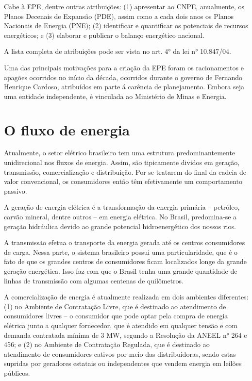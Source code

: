 \documentclass[grad,numbers]{coppe}
\begin{document}
  Cabe à EPE, dentre outras atribuições: (1) apresentar ao CNPE, anualmente, os Planos Decenais de Expansão (PDE), assim como a cada dois anos os Planos Nacionais de Energia (PNE); (2) identificar e quantificar os potenciais de recursos energéticos; e (3) elaborar e publicar o balanço energético nacional.
  
  A lista completa de atribuições pode ser vista no art. 4° da lei n° 10.847/04.
  
  Uma das principais motivações para a criação da EPE foram os racionamentos e apagões ocorridos no início da década, ocorridos durante o governo de Fernando Henrique Cardoso, atribuídos em parte á carência de planejamento. Embora seja uma entidade independente, é vinculada ao Ministério de Minas e Energia.
  
  \hypertarget{o-fluxo-de-energia}{%
  \section{O fluxo de energia}\label{o-fluxo-de-energia}}
  
  Atualmente, o setor elétrico brasileiro tem uma estrutura predominantemente unidirecional nos fluxos de energia. Assim, são tipicamente dividos em geração, transmissão, comercialização e distribuição. Por se tratarem do final da cadeia de valor convencional, os consumidores então têm efetivamente um comportamento passivo.
  
  A geração de energia elétrica é a transformação da energia primária -- petróleo, carvão mineral, dentre outros -- em energia elétrica. No Brasil, predomina-se a geração hidráulica devido ao grande potencial hidroenergético dos nossos rios.
  
  A transmissão efetua o transporte da energia gerada até os centros consumidores de carga. Nessa parte, o sistema brasileiro possui uma particularidade, que é o fato de que os grandes centros de consumidores ficam localizados longe da grande geração energética. Isso faz com que o Brasil tenha uma grande quantidade de linhas de transmissão com algumas centenas de quilômetros.
  
  A comercialização de energia é atualmente realizada em dois ambientes diferentes: (1) no Ambiente de Contratação Livre, que é destinado ao atendimento de consumidores livres -- o consumidor que pode optar pela compra de energia elétrica junto a qualquer fornecedor, que é atendido em qualquer tensão e com demanda contratada mínima de 3 MW, segundo a Resolução da ANEEL n° 264 e 456; e (2) no Ambiente de Contratação Regulada, que é destinado ao atendimento de consumidores cativos por meio das distribuidoras, sendo estas supridas por geradores estatais ou independentes que vendem energia em leilões públicos.
  
\end{document}
